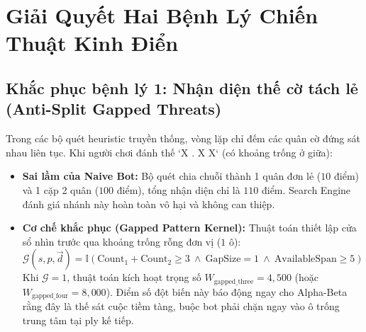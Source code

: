 \documentclass[11pt,a4paper]{article}
\begin{document}
\section{Giải Quyết Hai Bệnh Lý Chiến Thuật Kinh Điển}

\subsection{Khắc phục bệnh lý 1: Nhận diện thế cờ tách lẻ (Anti-Split Gapped Threats)}
Trong các bộ quét heuristic truyền thống, vòng lặp chỉ đếm các quân cờ đứng sát nhau liên tục. Khi người chơi đánh thế `X . X X` (có khoảng trống ở giữa):
\begin{itemize}
    \item \textbf{Sai lầm của Naive Bot:} Bộ quét chia chuỗi thành 1 quân đơn lẻ ($10$ điểm) và 1 cặp 2 quân ($100$ điểm), tổng nhận diện chỉ là $110$ điểm. Search Engine đánh giá nhánh này hoàn toàn vô hại và không can thiệp.
    \item \textbf{Cơ chế khắc phục (Gapped Pattern Kernel):} Thuật toán thiết lập cửa sổ nhìn trước qua khoảng trống rỗng đơn vị ($1$ ô):
    \begin{equation}
    \mathcal{G}(s, p, \vec{d}) = \mathbb{I}\left(\text{Count}_1 + \text{Count}_2 \ge 3 \ \land \ \text{GapSize} = 1 \ \land \ \text{AvailableSpan} \ge 5\right)
    \end{equation}
    Khi $\mathcal{G} = 1$, thuật toán kích hoạt trọng số $W_{\text{gapped\_three}} = 4{,}500$ (hoặc $W_{\text{gapped\_four}} = 8{,}000$). Điểm số đột biến này báo động ngay cho Alpha-Beta rằng đây là thế sát cuộc tiềm tàng, buộc bot phải chặn ngay vào ô trống trung tâm tại ply kế tiếp.
\end{itemize}
\end{document}
